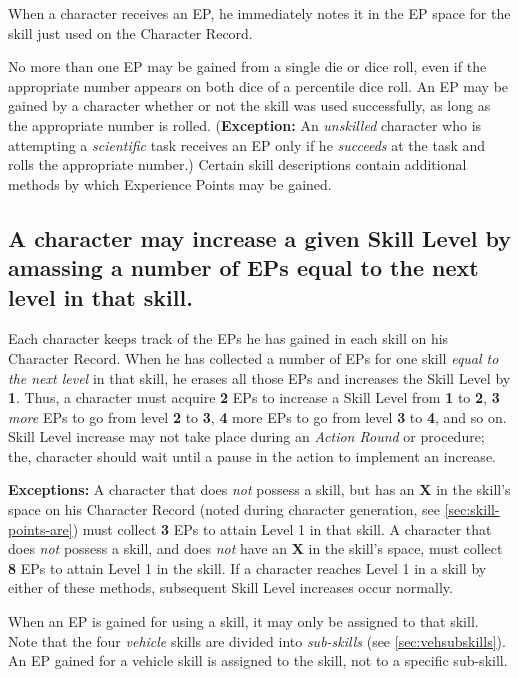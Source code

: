  

When a character receives an EP, he immediately notes it in the EP
space for the skill just used on the Character Record.

No more than one EP may be gained from a single die or dice roll, even
if the appropriate number appears on both dice of a percentile dice
roll.  An EP may be gained by a character whether or not the skill was
used successfully, as long as the appropriate number is rolled.
(\textbf{Exception:} An \emph{unskilled} character who is attempting a
\emph{scientific} task receives an EP only if he \emph{succeeds} at
the task and rolls the appropriate number.) Certain skill descriptions
contain additional methods by which Experience Points may be gained.


\subsection[Increasing Skill Levels]{A character may increase a given
  Skill Level by amassing a 
  number of EPs equal to the next level in that skill.}
\label{sec:char-may-incr}

Each character keeps track of the EPs he has gained in each skill on
his Character Record.  When he has collected a number of EPs for one
skill \emph{equal to the next level} in that skill, he erases all
those EPs and increases the Skill Level by \textbf{1}.  Thus, a
character must acquire \textbf{2} EPs to increase a Skill Level from
\textbf{1} to \textbf{2}, \textbf{3} \emph{more} EPs to go from level
\textbf{2} to \textbf{3}, \textbf{4} more EPs to go from level
\textbf{3} to \textbf{4}, and so on.  Skill Level increase may not take
place during an \emph{Action Round} or procedure; the, character
should wait until a pause in the action to implement an increase.

\textbf{Exceptions:} A character that does \emph{not} possess a skill,
but has an \textbf{\textsf{X}} in the skill's space on his Character
Record (noted during character generation, see
\ref{sec:skill-points-are}) must collect \textbf{3} EPs to attain
Level 1 in that skill.  A character that does \emph{not} possess a
skill, and does \emph{not} have an \textbf{\textsf{X}} in the skill's
space, must collect \textbf{8} EPs to attain Level 1 in the skill.  If
a character reaches Level 1 in a skill by either of these methods,
subsequent Skill Level increases occur normally.

When an EP is gained for using a skill, it may only be assigned to
that skill.  Note that the four \emph{vehicle} skills are divided into
\emph{sub-skills} (see \ref{sec:vehsubskills}).  An EP gained for a vehicle
skill is assigned to the skill, not to a specific sub-skill.


